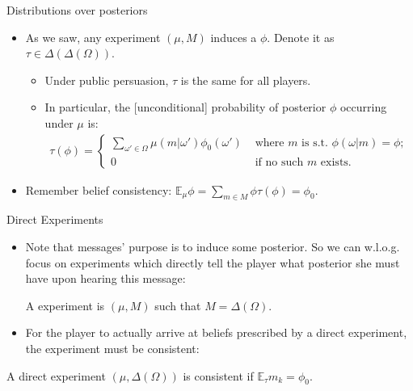 \documentclass[english,10pt
,aspectratio=169
]{beamer}
\begin{document}
\begin{frame}{Distributions over posteriors}
	\begin{itemize}
		\item As we saw, any experiment $(\mu,M)$ induces a  $\phi$. Denote it as $\tau \in \varDelta(\varDelta(\Omega))$.
		\begin{itemize}
			\item Under public persuasion, $\tau$ is the same for all players.
			\item In particular, the [unconditional] probability of posterior $\phi$ occurring under $\mu$ is:
			\begin{align*}
				\tau(\phi) = \begin{cases}
					\sum_{\omega' \in \Omega} \mu(m|\omega') \phi_0(\omega') & \text{ where $m$ is s.t. } \phi(\omega|m)=\phi;
					\\
					0 & \text{ if no such $m$ exists}.
				\end{cases}
			\end{align*}
		\end{itemize}
	
		\item Remember belief consistency: $\mathbb{E}_\mu \phi = \sum_{m \in M} \phi \tau(\phi) = \phi_0$.
	\end{itemize}
\end{frame}


\begin{frame}{Direct Experiments}
\begin{itemize}
	\item Note that messages'  purpose is to induce some posterior. So we can w.l.o.g. focus on experiments which directly tell the player what posterior she must have upon hearing this message:
	\begin{definition}
		A  experiment is $(\mu,M)$ such that $M = \varDelta(\Omega)$.
	\end{definition}
	\item For the player to actually arrive at beliefs prescribed by a direct experiment, the experiment must be consistent:
\end{itemize}
\begin{definition}
	A direct experiment $(\mu,\varDelta(\Omega))$ is \alert{consistent} if $\mathbb{E}_\tau m_k = \phi_0$.
\end{definition}
\end{frame}
\end{document}
